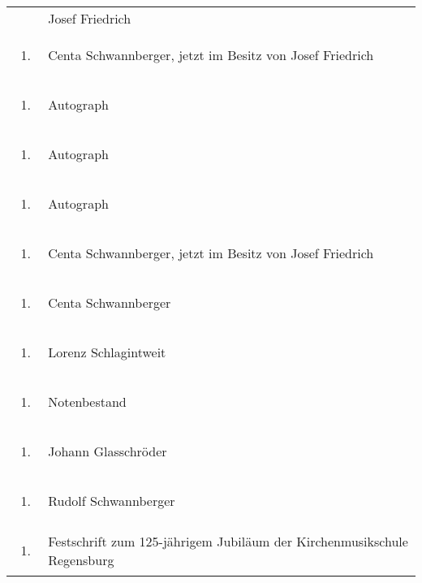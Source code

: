 \begin{flushleft}
\begin{supertabular}{m{1.2409999cm}m{14.604cm}}
 &
Josef Friedrich\\
\begin{enumerate}
\item
\end{enumerate}
 &
Centa Schwannberger, jetzt im Besitz von Josef Friedrich\\
\begin{enumerate}
\item
\end{enumerate}
 &
Autograph\\
\begin{enumerate}
\item
\end{enumerate}
 &
Autograph\\
\begin{enumerate}
\item
\end{enumerate}
 &
Autograph\\
\begin{enumerate}
\item
\end{enumerate}
 &
Centa Schwannberger, jetzt im Besitz von Josef Friedrich\\
\begin{enumerate}
\item
\end{enumerate}
 &
Centa Schwannberger\\
\begin{enumerate}
\item
\end{enumerate}
 &
Lorenz Schlagintweit\\
\begin{enumerate}
\item
\end{enumerate}
 &
Notenbestand\\
\begin{enumerate}
\item
\end{enumerate}
 &
Johann Glasschröder\\
\begin{enumerate}
\item
\end{enumerate}
 &
Rudolf Schwannberger\\
\begin{enumerate}
\item
\end{enumerate}
 &
Festschrift zum 125-jährigem Jubiläum der Kirchenmusikschule
Regensburg\\

\end{supertabular}
\end{flushleft}
